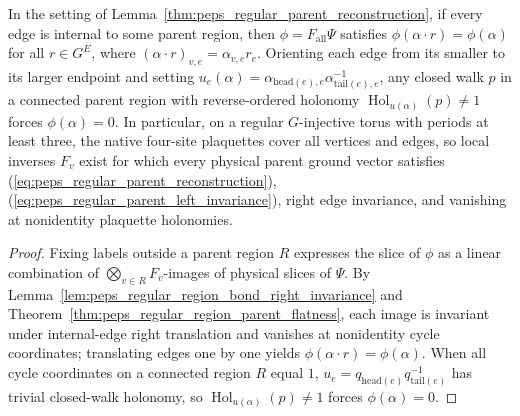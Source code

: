 \begin{lemma}%
    \label{thm:peps_regular_parent_coordinate_support}
    \leanok
    In the setting of Lemma~\ref{thm:peps_regular_parent_reconstruction},
    if every edge is internal to some parent region, then
    $\phi=F_{\mathrm{all}}\Psi$ satisfies $\phi(\alpha\cdot r)=\phi(\alpha)$
    for all $r\in G^E$, where $(\alpha\cdot r)_{v,e}=\alpha_{v,e}r_e$.
    Orienting each edge from its smaller to its larger endpoint and setting
    $u_e(\alpha)=\alpha_{\mathrm{head}(e),e}\alpha_{\mathrm{tail}(e),e}^{-1}$,
    any closed walk $p$ in a connected parent region with reverse-ordered
    holonomy $\operatorname{Hol}_{u(\alpha)}(p)\ne1$ forces $\phi(\alpha)=0$.
    In particular, on a regular $G$-injective torus with periods at least
    three, the native four-site plaquettes cover all vertices and edges, so
    local inverses $F_v$ exist for which every physical parent ground vector
    satisfies (\ref{eq:peps_regular_parent_reconstruction}),
    (\ref{eq:peps_regular_parent_left_invariance}), right edge invariance,
    and vanishing at nonidentity plaquette holonomies.
\end{lemma}
\begin{proof}\leanok
    Fixing labels outside a parent region $R$ expresses the slice of $\phi$
    as a linear combination of $\bigotimes_{v\in R}F_v$-images of physical
    slices of $\Psi$. By Lemma~\ref{lem:peps_regular_region_bond_right_invariance}
    and Theorem~\ref{thm:peps_regular_region_parent_flatness}, each image is
    invariant under internal-edge right translation and vanishes at
    nonidentity cycle coordinates; translating edges one by one yields
    $\phi(\alpha\cdot r)=\phi(\alpha)$. When all cycle coordinates on a
    connected region $R$ equal $1$, $u_e=q_{\mathrm{head}(e)}q_{\mathrm{tail}(e)}^{-1}$
    has trivial closed-walk holonomy, so $\operatorname{Hol}_{u(\alpha)}(p)\ne1$
    forces $\phi(\alpha)=0$.
\end{proof}

